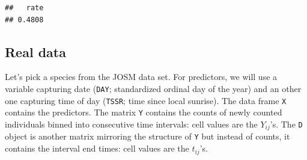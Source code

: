 \documentclass[12pt,]{book}
\newenvironment{Shaded}{\begin{snugshade}}{\end{snugshade}}
\newcommand{\ControlFlowTok}[1]{\textcolor[rgb]{0.13,0.29,0.53}{\textbf{#1}}}
\newcommand{\DataTypeTok}[1]{\textcolor[rgb]{0.13,0.29,0.53}{#1}}
\newcommand{\DecValTok}[1]{\textcolor[rgb]{0.00,0.00,0.81}{#1}}
\newcommand{\KeywordTok}[1]{\textcolor[rgb]{0.13,0.29,0.53}{\textbf{#1}}}
\newcommand{\NormalTok}[1]{#1}
\newcommand{\OperatorTok}[1]{\textcolor[rgb]{0.81,0.36,0.00}{\textbf{#1}}}
\newcommand{\OtherTok}[1]{\textcolor[rgb]{0.56,0.35,0.01}{#1}}
\newcommand{\StringTok}[1]{\textcolor[rgb]{0.31,0.60,0.02}{#1}}
\begin{document}
\begin{verbatim}
##   rate 
## 0.4808
\end{verbatim}

\hypertarget{real-data}{%
\subsection{Real data}\label{real-data}}

Let's pick a species from the JOSM data set.
For predictors, we will use a variable capturing date (\texttt{DAY}; standardized ordinal day of the year)
and an other one capturing time of day (\texttt{TSSR}; time since local sunrise).
The data frame \texttt{X} contains the predictors.
The matrix \texttt{Y} contains the counts of newly counted individuals binned into consecutive time intervals:
cell values are the \(Y_{ij}\)'s. The \texttt{D} object is another matrix mirroring the structure of \texttt{Y}
but instead of counts, it contains the interval end times: cell values are
the \(t_{ij}\)'s.

\begin{Shaded}
\end{Shaded}
\end{document}
